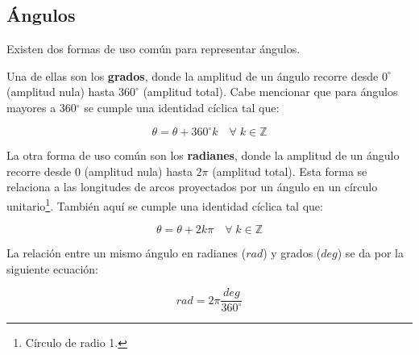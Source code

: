 \documentclass[spanish,12pt]{article}
\newcommand{\Z}{\mathbb{Z}}
\begin{document}
\newpage
\subsection{Ángulos}

Existen dos formas de uso común para representar ángulos. 

Una de ellas son los \textbf{grados}, donde la amplitud de un ángulo recorre desde $0^{\circ}$ (amplitud nula) hasta $360^{\circ}$ (amplitud total). Cabe mencionar que para ángulos mayores a 360$^{\circ}$ se cumple una identidad cíclica tal que:

$$\theta=\theta+360^{\circ}k\quad\forall\;k\in\Z$$

La otra forma de uso común son los \textbf{radianes}, donde la amplitud de un ángulo recorre desde $0$ (amplitud nula) hasta $2\pi$ (amplitud total). Esta forma se relaciona a las longitudes de arcos proyectados por un ángulo en un círculo unitario\footnote{Círculo de radio 1.}. También aquí se cumple una identidad cíclica tal que:

$$\theta=\theta+2k\pi\quad\forall\;k\in\Z$$

La relación entre un mismo ángulo en radianes ($rad$) y grados ($deg$) se da por la siguiente ecuación:

$$rad=2\pi\frac{deg}{360^{\circ}}$$
\end{document}
